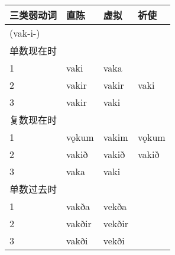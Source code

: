 \begin{longtable}{llll}
    \toprule
    三类弱动词 & 直陈                                                                                                      & 虚拟   & 祈使  \\
    \midrule
    \endhead
    \bottomrule
    \endfoot
    (vak-i-)   &                                                                                                           &        &       \\
    单数现在时 &                                                                                                           &        &       \\
    1          & vaki                                                                                                      & vaka   &       \\
    2          & vakir                                                                                                     & vakir  & vaki  \\
    3          & vakir                                                                                                     & vaki   &       \\
    复数现在时 &                                                                                                           &        &       \\
    1          & vǫkum                                                                                                     & vakim  & vǫkum \\
    2          & vakið                                                                                                     & vakið  & vakið \\
    3          & vaka                                                                                                      & vaki   &       \\
    单数过去时 &                                                                                                           &        &       \\
    1          & vakða                                                                                                     & vekða  &       \\
    2          & vakðir                                                                                                    & vekðir &       \\
    3          & vakði                                                                                                     & vekði  &       \\

\end{longtable}
